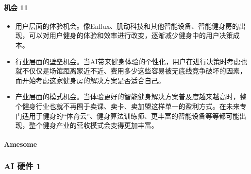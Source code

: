 \documentclass[letterpaper,11pt,english]{sphinxmanual}
\begin{document}
\paragraph{机会 11\sphinxfootnotemark[265]}
\label{\detokenize{chapter_project/AI_fit:id16}}%
\begin{footnotetext}[265]\sphinxAtStartFootnote
{}
%
\end{footnotetext}\ignorespaces \begin{itemize}
\item {} 
用户层面的体验机会。像Enflux、肌动科技和其他智能设备、智能健身房的出现，可以对用户健身的体验和效率进行改变，逐渐减少健身中的用户决策成本。

\item {} 
行业层面的壁垒机会。当AI带来健身体验的个性化，用户在进行决策时考虑也就不仅仅是场馆距离家近不近、费用多少这些容易被无底线竞争破坏的因素，而开始考虑这家健身房的解决方案是否适合自己。

\item {} 
产业层面的模式机会。当体验更好的智能健身解决方案普及度越来越高时，整个健身行业也就不再囿于卖课、卖卡、卖加盟这样单一的盈利方式。在未来专门适用于健身的“体育云”、健身算法训练师、更丰富的智能设备等等都可能出现，整个健身产业的营收模式会变得更加丰富。

\end{itemize}


\paragraph{Amesome}
\label{\detokenize{chapter_project/AI_fit:amesome}}


\subsubsection{AI 硬件 1\sphinxfootnotemark[266]}
\label{\detokenize{chapter_project/AI_hardware:ai-1}}\label{\detokenize{chapter_project/AI_hardware::doc}}%
\begin{footnotetext}[266]\sphinxAtStartFootnote
{}
%
\end{footnotetext}\ignorespaces 
\end{document}
